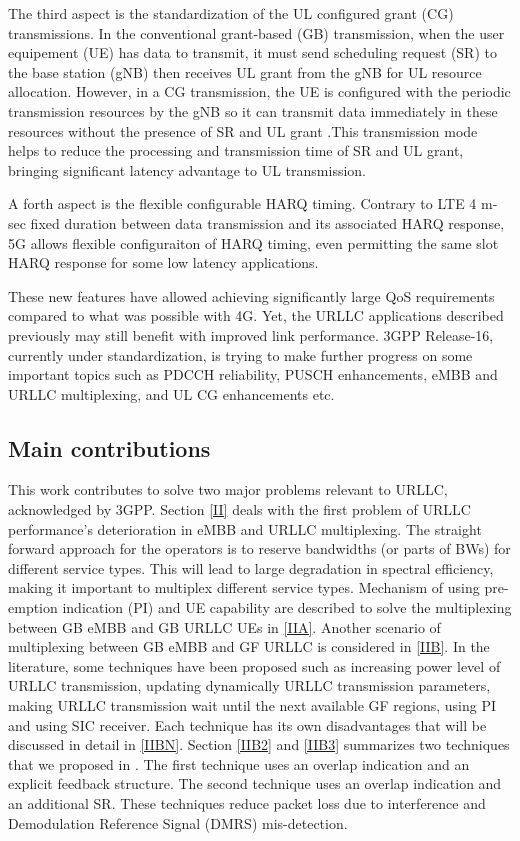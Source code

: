 \documentclass{ieeeaccess}
\begin{document}
The third aspect is the standardization of the UL configured grant (CG) transmissions. In the conventional grant-based (GB) transmission, when the user equipement (UE) has data to transmit, it must send scheduling request (SR) to the base station (gNB) then receives UL grant from the gNB for UL resource allocation. However, in a CG transmission, the UE is configured with the periodic transmission resources by the gNB so it can transmit data immediately in these resources without the presence of SR and UL grant \cite{ref5}.This transmission mode helps to reduce the processing and transmission time of SR and UL grant, bringing significant latency advantage to UL transmission.

A forth aspect is the flexible configurable HARQ timing. Contrary to LTE 4 m-sec fixed duration between data transmission and its associated HARQ response, 5G allows flexible configuraiton of HARQ timing, even permitting the same slot HARQ response for some low latency applications.

These new features have allowed achieving significantly large QoS requirements compared to what was possible with 4G. Yet, the URLLC applications described previously may still benefit with improved link performance. 3GPP Release-16, currently under standardization, is trying to make further progress on some important topics such as PDCCH reliability, PUSCH enhancements, eMBB and URLLC multiplexing, and UL CG enhancements etc. 

\subsection{Main contributions}

This work contributes to solve two major problems relevant to URLLC, acknowledged by 3GPP. Section \ref{II} deals with the first problem of URLLC performance's deterioration in eMBB and URLLC multiplexing. The straight forward approach for the operators is to reserve bandwidths (or parts of BWs) for different service types. This will lead to large degradation in spectral efficiency, making it important to multiplex different service types. Mechanism of using pre-emption indication (PI) and UE capability are described to solve the multiplexing between GB eMBB and GB URLLC UEs in \ref{IIA}. Another scenario of multiplexing between GB eMBB and GF URLLC is considered in \ref{IIB}. In the literature, some techniques have been proposed such as increasing power level of URLLC transmission, updating dynamically URLLC transmission parameters, making URLLC transmission wait until the next available GF regions, using PI and using SIC receiver. Each technique has its own disadvantages that will be discussed in detail in \ref{IIBN}. Section \ref{IIB2} and \ref{IIB3} summarizes two techniques that we proposed in \cite{ad99}. The first technique uses an overlap indication and an explicit feedback structure. The second technique uses an overlap indication and an additional SR. These techniques reduce packet loss due to interference and Demodulation Reference Signal (DMRS) mis-detection. 
\end{document}
